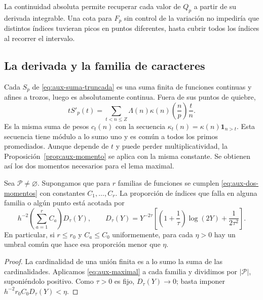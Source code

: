 La continuidad absoluta permite recuperar cada valor de $Q_p$ a partir
de su derivada integrable. Una cota para $F_p$ sin control de la
variación no impediría que distintos índices tuvieran picos en
puntos diferentes, hasta cubrir todos los índices al recorrer el intervalo.

\subsection{La derivada y la familia de caracteres}

Cada $S_p$ de \eqref{eq:aux-suma-truncada} es una suma finita de
funciones continuas y afines a trozos, luego es absolutamente continua.
Fuera de sus puntos de quiebre,
\begin{equation}
 tS'_p(t)=\sum_{t<n\le Z}\Lambda(n)\kappa(n)
                         \left(\frac n p\right)\frac t n.
 \label{eq:aux-derivada}
\end{equation}
Es la misma suma de pesos $c_t(n)$ con la secuencia
$\kappa_t(n)=\kappa(n)\mathbf1_{n>t}$. Esta secuencia tiene módulo
a lo sumo uno y es común a todos los primos promediados. Aunque depende
de $t$ y puede perder multiplicatividad, la Proposición~\ref{prop:aux-momento}
se aplica con la misma constante. Se obtienen así los dos momentos
necesarios para el lema maximal.

\begin{proposicion}
\label{prop:aux-familia}
Sea $\mathcal P\ne\varnothing$. Supongamos que para $r$ familias de funciones se cumplen
\eqref{eq:aux-dos-momentos} con constantes $C_1,\ldots,C_r$.
La proporción de índices que falla en alguna familia o algún punto
está acotada por
\begin{equation}
 h^{-2}\left(\sum_{a=1}^r C_a\right)D_\tau(Y),
 \qquad
 D_\tau(Y)=Y^{-2\tau}
 \left[\left(1+\frac1\tau\right)\log(2Y)+\frac1{2\tau^2}\right].
 \label{eq:aux-union}
\end{equation}
En particular, si $r\le r_0$ y $C_a\le C_0$ uniformemente, para
cada $\eta>0$ hay un umbral común que hace esa proporción menor
que $\eta$.
\end{proposicion}

\begin{proof}
La cardinalidad de una unión finita es a lo sumo la suma de las
cardinalidades. Aplicamos \eqref{eq:aux-maximal} a cada familia y
dividimos por $|\mathcal P|$, suponiéndolo positivo.
Como $\tau>0$ es fijo, $D_\tau(Y)\to0$; basta imponer
$h^{-2}r_0C_0D_\tau(Y)<\eta$.
\end{proof}

